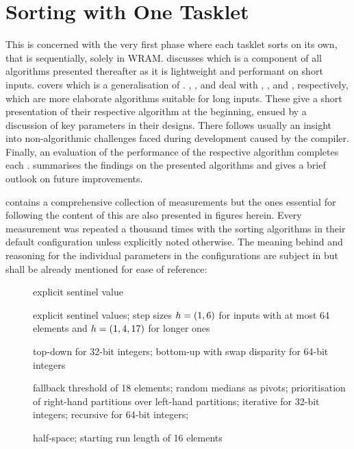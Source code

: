 \chapter{Sorting with One Tasklet}
\label{sec:tasklet}

This  is concerned with the very first phase where each tasklet sorts on its own, that is sequentially, solely in WRAM.
 discusses \IS{} which is a component of all algorithms presented thereafter as it is lightweight and performant on short inputs.
 covers \ShS{} which is a generalisation of \IS{}.
\hyperref[sec:tasklet:heap]{ }, , and  deal with \HS{}, \QS{}, and \MS{}, respectively, which are more elaborate algorithms suitable for long inputs.
These  give a short presentation of their respective algorithm at the beginning, ensued by a discussion of key parameters in their designs.
There follows usually an insight into non-algorithmic challenges faced during development caused by the compiler.
Finally, an evaluation of the performance of the respective algorithm completes each .
 summarises the findings on the presented algorithms and gives a brief outlook on future improvements.

 contains a comprehensive collection of measurements but the ones essential for following the content of this  are also presented in figures herein.
Every measurement was repeated a thousand times with the sorting algorithms in their default configuration unless explicitly noted otherwise.
The meaning behind and reasoning for the individual parameters in the configurations are subject in  but shall be already mentioned for ease of reference:
\begin{description}
	\item[\IS{}]
	explicit sentinel value

	\item[\ShS{}]
	explicit sentinel values;
	step sizes \(h = (1, 6)\) for inputs with at most 64 elements and \(h = (1, 4, 17)\) for longer ones

	\item[\HS{}]
	top-down for 32-bit integers;
	bottom-up with swap disparity for 64-bit integers

	\item[\QS{}]
	fallback threshold of 18 elements;
	random medians as pivots;
	prioritisation of right-hand partitions over left-hand partitions;
	iterative for 32-bit integers;
	recursive for 64-bit integers;

	\item[\MS{}]
	half-space;
	starting run length of 16 elements
\end{description}

